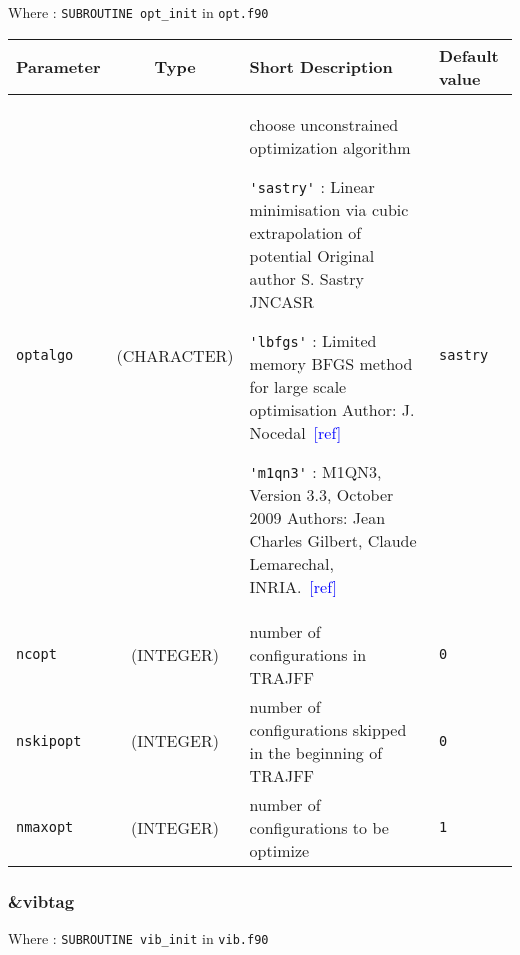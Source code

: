 \documentclass[a4paper]{article}
\newcommand{\addref}{\textcolor{blue}{[ref]}}
\begin{document}
Where : \verb?SUBROUTINE opt_init? in \verb?opt.f90?
\newline

\begin{longtable}{l|c|m{8cm}|m{2cm}}
\hline
\hline
Parameter        &  Type              &          Short Description                                                          & Default value \\
\hline
\hline
\rule[-0.75cm]{0cm}{1.5cm}
\verb?optalgo?   & (CHARACTER)        & \newline choose unconstrained optimization algorithm \newline 

                                        \verb?'sastry'? : Linear minimisation via cubic extrapolation of potential 
					Original author S. Sastry JNCASR \newline

					\verb?'lbfgs'? : Limited memory BFGS method for large scale optimisation
					Author: J. Nocedal~\addref  \newline 
					 
					\verb?'m1qn3'? : M1QN3, Version 3.3, October 2009
					Authors: Jean Charles Gilbert, Claude Lemarechal, INRIA.~\addref \newline            & \verb?sastry? \tabularnewline
\hline
\rule[-0.75cm]{0cm}{1.5cm}
\verb?ncopt?     & (INTEGER)          & number of configurations in TRAJFF                                                   & \verb?0? \\
\hline
\rule[-0.75cm]{0cm}{1.5cm}
\verb?nskipopt?  & (INTEGER)          & number of configurations skipped in the beginning of TRAJFF                          & \verb?0? \\
\hline
\rule[-0.75cm]{0cm}{1.5cm}
\verb?nmaxopt?   & (INTEGER)          & number of configurations to be optimize                                              & \verb?1? \\
\hline
\hline
\end{longtable}

\subsubsection{\&vibtag}

Where : \verb?SUBROUTINE vib_init? in \verb?vib.f90?
\newline
\end{document}
